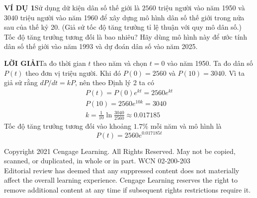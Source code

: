 \begin{minipage}[t]{387pt}
    \vspace{0.4em}
    \noindent\textcolor{stewartcyan}{\textbf{\textsf{VÍ DỤ 1}}}\hspace{0.8em}Sử dụng dữ kiện dân số thế giới là $2560$ triệu người vào năm 1950 và $3040$ triệu người vào năm 1960 để xây dựng mô hình dân số thế giới trong nửa sau của thế kỷ 20. (Giả sử tốc độ tăng trưởng tỉ lệ thuận với quy mô dân số.) Tốc độ tăng trưởng tương đối là bao nhiêu? Hãy dùng mô hình này để ước tính dân số thế giới vào năm 1993 và dự đoán dân số vào năm 2025.

    \vspace{0.4em}
    \noindent\textcolor{stewartcyan}{\textbf{\textsf{LỜI GIẢI}}}\hspace{0.8em}Ta đo thời gian $t$ theo năm và chọn $t = 0$ vào năm 1950. Ta đo dân số $P(t)$ theo đơn vị triệu người. Khi đó $P(0) = 2560$ và $P(10) = 3040$. Vì ta giả sử rằng $dP/dt = kP$, nên theo Định lý 2 ta có
    \begin{gather*}
        P(t) = P(0)e^{kt} = 2560e^{kt} \\[3pt]
        P(10) = 2560e^{10k} = 3040 \\[3pt]
        k = \frac{1}{10} \ln \frac{3040}{2560} \approx 0.017185
    \end{gather*}
    Tốc độ tăng trưởng tương đối vào khoảng $1.7\%$ mỗi năm và mô hình là
    \[
        P(t) = 2560e^{0.017185t}
    \]
\end{minipage}

\vfill
\begin{center}
    {\fontsize{5.5pt}{7pt}\selectfont\color{stewartgray}%
    Copyright 2021 Cengage Learning. All Rights Reserved. May not be copied, scanned, or duplicated, in whole or in part. WCN 02-200-203\\[1pt]
    Editorial review has deemed that any suppressed content does not materially affect the overall learning experience. Cengage Learning reserves the right to remove additional content at any time if subsequent rights restrictions require it.\par}
\end{center}

